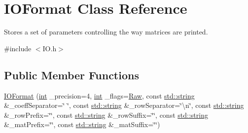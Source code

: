 \hypertarget{struct_i_o_format}{\section{I\-O\-Format Class Reference}
\label{struct_i_o_format}
}


Stores a set of parameters controlling the way matrices are printed.  




{\ttfamily \#include $<$I\-O.\-h$>$}

\subsection*{Public Member Functions}
\begin{DoxyCompactItemize}
\item 
\hyperlink{struct_i_o_format_a879d4f37871fca94c3aee7ca3bdb62e3}{I\-O\-Format} (\hyperlink{ioapi_8h_a787fa3cf048117ba7123753c1e74fcd6}{int} \-\_\-precision=4, \hyperlink{ioapi_8h_a787fa3cf048117ba7123753c1e74fcd6}{int} \-\_\-flags=\hyperlink{_i_o_8h_a26e1124d33b4acdb532c49f6498df549a5bdc2d0b1113f3630fc502864541fc23}{Raw}, const \hyperlink{glext_8h_aa81bcd27b2208041814b4beacb88c2d9}{std\-::string} \&\-\_\-coeff\-Separator=\char`\"{} \char`\"{}, const \hyperlink{glext_8h_aa81bcd27b2208041814b4beacb88c2d9}{std\-::string} \&\-\_\-row\-Separator=\char`\"{}\textbackslash{}n\char`\"{}, const \hyperlink{glext_8h_aa81bcd27b2208041814b4beacb88c2d9}{std\-::string} \&\-\_\-row\-Prefix=\char`\"{}\char`\"{}, const \hyperlink{glext_8h_aa81bcd27b2208041814b4beacb88c2d9}{std\-::string} \&\-\_\-row\-Suffix=\char`\"{}\char`\"{}, const \hyperlink{glext_8h_aa81bcd27b2208041814b4beacb88c2d9}{std\-::string} \&\-\_\-mat\-Prefix=\char`\"{}\char`\"{}, const \hyperlink{glext_8h_aa81bcd27b2208041814b4beacb88c2d9}{std\-::string} \&\-\_\-mat\-Suffix=\char`\"{}\char`\"{})
\end{DoxyCompactItemize}
